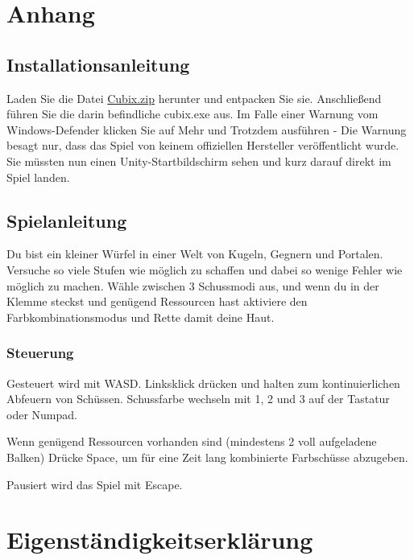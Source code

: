 \documentclass[a4paper,ngerman,12pt]{report}
\begin{document}
\newpage
\newpage
\chapter{Anhang}




\section{Installationsanleitung}

Laden Sie die Datei \href{https://www.dropbox.com/s/g82vexjznq1x9dd/Cubix.zip?dl=1}{Cubix.zip} herunter und entpacken Sie sie. Anschlie{\ss}end führen Sie die darin befindliche cubix.exe aus.
Im Falle einer Warnung vom Windows-Defender klicken Sie auf Mehr und Trotzdem ausführen - Die Warnung besagt nur, dass das Spiel von keinem offiziellen Hersteller veröffentlicht wurde.
Sie müssten nun einen Unity-Startbildschirm sehen und kurz darauf direkt im Spiel landen.




\section{Spielanleitung}

Du bist ein kleiner Würfel in einer Welt von Kugeln, Gegnern und Portalen. Versuche so viele Stufen wie möglich zu schaffen und dabei so wenige Fehler wie möglich zu machen. Wähle zwischen 3 Schussmodi aus, und wenn du in der Klemme steckst und genügend Ressourcen hast aktiviere den Farbkombinationsmodus und Rette damit deine Haut.



\subsection{Steuerung}

Gesteuert wird mit WASD. Linksklick drücken und halten zum kontinuierlichen Abfeuern von Schüssen. Schussfarbe wechseln mit 1, 2 und 3 auf der Tastatur oder Numpad.

Wenn genügend Ressourcen vorhanden sind (mindestens 2 voll aufgeladene Balken) Drücke Space, um für eine Zeit lang kombinierte Farbschüsse abzugeben.

Pausiert wird das Spiel mit Escape.





\chapter{Eigenständigkeitserklärung}
\end{document}
